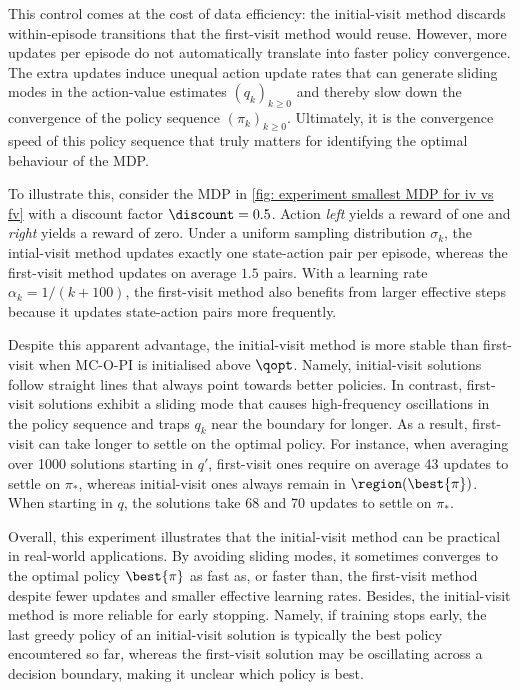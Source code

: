 This control comes at the cost of data efficiency: the initial-visit method discards within-episode transitions that the first-visit method would reuse. However, more updates per episode do not automatically translate into faster policy convergence.
The extra updates induce unequal action update rates that can generate sliding modes in the action-value estimates $(q_k)_{k \ge 0}$ and thereby slow down the convergence of the policy sequence $(\pi_k)_{k \ge 0}$. Ultimately, it is the convergence speed of this policy sequence that truly matters for identifying the optimal behaviour of the MDP.

To illustrate this, consider the MDP in \autoref{fig: experiment smallest MDP for iv vs fv} with a discount factor $\discount = 0.5$. Action \textit{left} yields a reward of one and \textit{right} yields a reward of zero.
Under a uniform sampling distribution $\sigma_k$, the intial-visit method updates exactly one state-action pair per episode, whereas the first-visit method updates on average $1.5$ pairs.
With a learning rate $\alpha_k = 1/(k+100)$, the first-visit method also benefits from larger effective steps because it updates state-action pairs more frequently.


Despite this apparent advantage, the initial-visit method is more stable than first-visit when MC-O-PI is initialised above $\qopt$.
Namely, initial-visit solutions follow straight lines that always point towards better policies.
In contrast, first-visit solutions exhibit a sliding mode that causes high-frequency oscillations in the policy sequence and traps $q_k$ near the boundary for longer.
As a result, first-visit can take longer to settle on the optimal policy.
For instance, when averaging over 1000 solutions starting in $q'$, first-visit ones require on average 43 updates to settle on $\pi_*$, whereas initial-visit ones always remain in $\region(\best{\pi})$.
When starting in $q$, the solutions take 68 and 70 updates to settle on $\pi_*$.


Overall, this experiment illustrates that the initial-visit method can be practical in real-world applications.
By avoiding sliding modes, it sometimes converges to the optimal policy $\best{\pi}$ as fast as, or faster than, the first-visit method despite fewer updates and smaller effective learning rates.
Besides, the initial-visit method is more reliable for early stopping. Namely, if training stops early, the last greedy policy of an initial-visit solution is typically the best policy encountered so far, whereas the first-visit solution may be oscillating across a decision boundary, making it unclear which policy is best.

